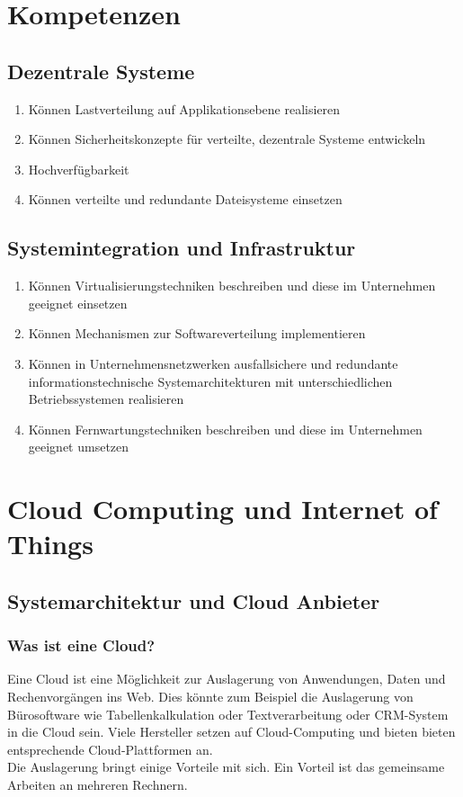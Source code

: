 
\section{Kompetenzen}
\label{sec:Kompetenzen}
\subsection{Dezentrale Systeme}
\label{subsec:Dezentrale Systeme}
\begin{enumerate}
\item Können Lastverteilung auf
Applikationsebene realisieren
\item Können Sicherheitskonzepte für
verteilte, dezentrale Systeme
entwickeln
\item Hochverfügbarkeit
\item Können verteilte und redundante
Dateisysteme einsetzen
\end{enumerate}

\subsection{Systemintegration und Infrastruktur}
\label{subsec:Systemintegration und Infrastruktur}
\begin{enumerate}
\item Können
Virtualisierungstechniken
beschreiben und diese im
Unternehmen geeignet einsetzen
\item Können Mechanismen zur
Softwareverteilung
implementieren
\item Können in Unternehmensnetzwerken ausfallsichere und redundante informationstechnische Systemarchitekturen mit unterschiedlichen Betriebssystemen realisieren
\item Können Fernwartungstechniken
beschreiben und diese im
Unternehmen geeignet umsetzen
\end{enumerate}

\section{Cloud Computing und Internet of Things}
\label{sec:Cloud Computing und Internet of Things}
\subsection{Systemarchitektur und Cloud Anbieter}
\label{subsec:Systemarchitektur und Cloud Anbieter}
\subsubsection{Was ist eine Cloud?}
\label{subsubsec:Was ist eine Cloud?}
Eine Cloud ist eine Möglichkeit zur Auslagerung von Anwendungen, Daten und Rechenvorgängen ins Web. Dies könnte zum Beispiel die Auslagerung von Bürosoftware wie Tabellenkalkulation oder Textverarbeitung oder CRM-System in die Cloud sein. Viele Hersteller setzen auf Cloud-Computing und bieten bieten entsprechende Cloud-Plattformen an. \\
Die Auslagerung bringt einige Vorteile mit sich. Ein Vorteil ist das gemeinsame Arbeiten an mehreren Rechnern.

